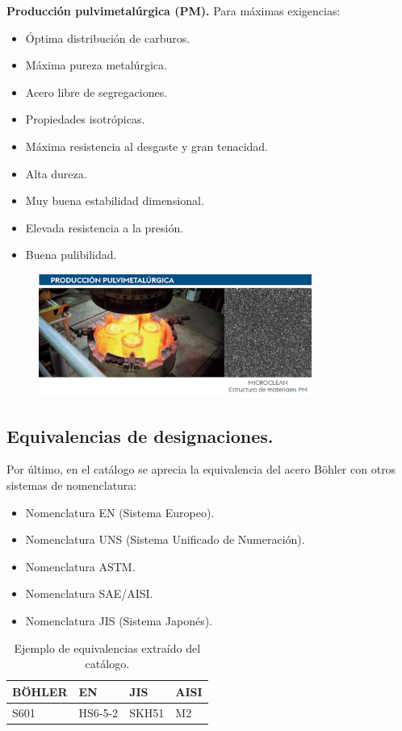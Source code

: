 \documentclass[12pt,a4paper]{article}
\begin{document}
\textbf{Producción pulvimetalúrgica (PM).} Para máximas exigencias:
\begin{itemize}
    \item Óptima distribución de carburos.
    \item Máxima pureza metalúrgica.
    \item Acero libre de segregaciones.
    \item Propiedades isotrópicas.
    \item Máxima resistencia al desgaste y gran tenacidad.
    \item Alta dureza.
    \item Muy buena estabilidad dimensional.
    \item Elevada resistencia a la presión.
    \item Buena pulibilidad.
\end{itemize}
\begin{figure}[H]    
    \centering         
    \includegraphics[width=0.8\textwidth]{Inagenes para latex/9.png}
\end{figure}

\subsection{Equivalencias de designaciones.}
Por último, en el catálogo se aprecia la equivalencia del acero Böhler con otros sistemas de nomenclatura:

\begin{itemize}
    \item Nomenclatura EN (Sistema Europeo).
    \item Nomenclatura UNS (Sistema Unificado de Numeración).
    \item Nomenclatura ASTM.
    \item Nomenclatura SAE/AISI.
    \item Nomenclatura JIS (Sistema Japonés).
\end{itemize}

\begin{table}[h!]
    \centering
    \begin{tabular}{llll}
        \hline
        \textbf{BÖHLER} & \textbf{EN} & \textbf{JIS} & \textbf{AISI} \\ \hline
        S601 & HS6-5-2 & SKH51 & M2 \\ \hline
    \end{tabular}
    \caption{Ejemplo de equivalencias extraído del catálogo.}
    \label{tab:equivalencias-bohler}
\end{table}
\end{document}
